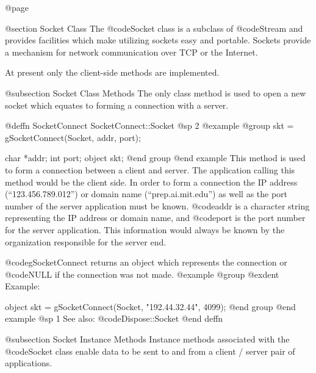 @page

@section Socket Class
The @code{Socket} class is a subclass of @code{Stream} and provides
facilities which make utilizing sockets easy and portable.  Sockets
provide a mechanism for network communication over TCP or the Internet.


At present only the client-side methods are implemented.


@subsection Socket Class Methods
The only class method is used to open a new socket which equates to
forming a connection with a server.














@deffn {SocketConnect} SocketConnect::Socket
@sp 2
@example
@group
skt = gSocketConnect(Socket, addr, port);

char    *addr;
int     port;
object  skt;
@end group
@end example
This method is used to form a connection between a client and server.
The application calling this method would be the client side.  In order
to form a connection the IP address (``123.456.789.012'') or domain name
(``prep.ai.mit.edu'') as well as the port number of the server
application must be known.  @code{addr} is a character string representing
the IP address or domain name, and @code{port} is the port number for the
server application.  This information would always be known by the organization
responsible for the server end.

@code{gSocketConnect} returns an object which represents the connection or
@code{NULL} if the connection was not made.
@example
@group
@exdent Example:

object  skt = gSocketConnect(Socket, "192.44.32.44", 4099);
@end group
@end example
@sp 1
See also:  @code{Dispose::Socket}
@end deffn










@subsection Socket Instance Methods
Instance methods associated with the @code{Socket} class enable data to
be sent to and from a client / server pair of applications.
















